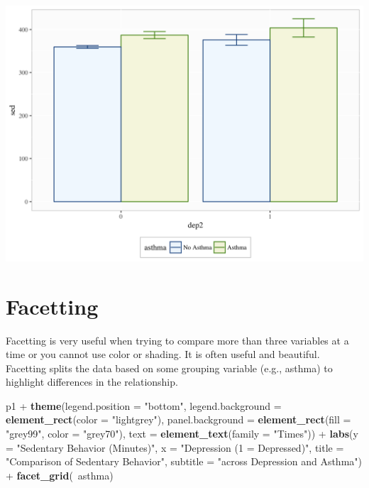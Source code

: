 \documentclass[]{tufte-book}
\newenvironment{Shaded}{}{}
\newcommand{\KeywordTok}[1]{\textcolor[rgb]{0.00,0.44,0.13}{\textbf{#1}}}
\newcommand{\DataTypeTok}[1]{\textcolor[rgb]{0.56,0.13,0.00}{#1}}
\newcommand{\StringTok}[1]{\textcolor[rgb]{0.25,0.44,0.63}{#1}}
\newcommand{\OperatorTok}[1]{\textcolor[rgb]{0.40,0.40,0.40}{#1}}
\newcommand{\NormalTok}[1]{#1}
\theoremstyle{definition}
\theoremstyle{definition}
\theoremstyle{remark}
\begin{document}
\includegraphics{_main_files/figure-latex/unnamed-chunk-154-1}

\section*{Facetting}\label{facetting}

Facetting is very useful when trying to compare more than three
variables at a time or you cannot use color or shading. It is often
useful and beautiful. Facetting splits the data based on some grouping
variable (e.g., asthma) to highlight differences in the relationship.

\begin{Shaded}
\begin{Highlighting}[]
\NormalTok{p1 }\OperatorTok{+}\StringTok{ }\KeywordTok{theme}\NormalTok{(}\DataTypeTok{legend.position =} \StringTok{"bottom"}\NormalTok{, }\DataTypeTok{legend.background =} \KeywordTok{element_rect}\NormalTok{(}\DataTypeTok{color =} \StringTok{"lightgrey"}\NormalTok{), }
    \DataTypeTok{panel.background =} \KeywordTok{element_rect}\NormalTok{(}\DataTypeTok{fill =} \StringTok{"grey99"}\NormalTok{, }
        \DataTypeTok{color =} \StringTok{"grey70"}\NormalTok{), }\DataTypeTok{text =} \KeywordTok{element_text}\NormalTok{(}\DataTypeTok{family =} \StringTok{"Times"}\NormalTok{)) }\OperatorTok{+}\StringTok{ }
\StringTok{    }\KeywordTok{labs}\NormalTok{(}\DataTypeTok{y =} \StringTok{"Sedentary Behavior (Minutes)"}\NormalTok{, }\DataTypeTok{x =} \StringTok{"Depression (1 = Depressed)"}\NormalTok{, }
        \DataTypeTok{title =} \StringTok{"Comparison of Sedentary Behavior"}\NormalTok{, }
        \DataTypeTok{subtitle =} \StringTok{"across Depression and Asthma"}\NormalTok{) }\OperatorTok{+}\StringTok{ }
\StringTok{    }\KeywordTok{facet_grid}\NormalTok{(}\OperatorTok{~}\NormalTok{asthma)}
\end{Highlighting}
\end{Shaded}
\end{document}
